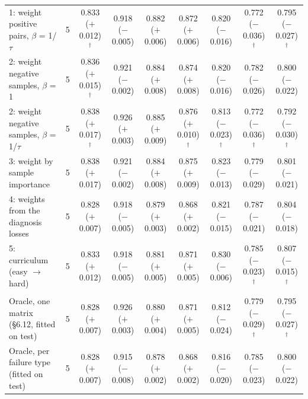 \begin{table}[t]
{\begin{tabular}{l c c c c c c c c}
1: weight positive pairs, $\beta$ = 1/$\tau$ & 5 & 0.833 ($+$0.012)$^{\dagger}$ & 0.918 ($-$0.005) & 0.882 ($+$0.006) & 0.872 ($+$0.006) & 0.820 ($-$0.016) & 0.772 ($-$0.036)$^{\dagger}$ & 0.795 ($-$0.027)$^{\dagger}$ \\
2: weight negative samples, $\beta$ = 1 & 5 & 0.836 ($+$0.015)$^{\dagger}$ & 0.921 ($-$0.002) & 0.884 ($+$0.008) & 0.874 ($+$0.008) & 0.820 ($-$0.016) & 0.782 ($-$0.026) & 0.800 ($-$0.022) \\
2: weight negative samples, $\beta$ = 1/$\tau$ & 5 & 0.838 ($+$0.017)$^{\dagger}$ & 0.926 ($+$0.003) & 0.885 ($+$0.009) & 0.876 ($+$0.010)$^{\dagger}$ & 0.813 ($-$0.023)$^{\dagger}$ & 0.772 ($-$0.036)$^{\dagger}$ & 0.792 ($-$0.030)$^{\dagger}$ \\
3: weight by sample importance & 5 & 0.838 ($+$0.017) & 0.921 ($-$0.002) & 0.884 ($+$0.008) & 0.875 ($+$0.009) & 0.823 ($-$0.013) & 0.779 ($-$0.029) & 0.801 ($-$0.021) \\
4: weights from the diagnosis losses & 5 & 0.828 ($+$0.007) & 0.918 ($-$0.005) & 0.879 ($+$0.003) & 0.868 ($+$0.002) & 0.821 ($-$0.015) & 0.787 ($-$0.021) & 0.804 ($-$0.018) \\
5: curriculum (easy $\rightarrow$ hard) & 5 & 0.833 ($+$0.012) & 0.918 ($-$0.005) & 0.881 ($+$0.005) & 0.871 ($+$0.005) & 0.830 ($-$0.006) & 0.785 ($-$0.023)$^{\dagger}$ & 0.807 ($-$0.015)$^{\dagger}$ \\
\addlinespace
\multicolumn{9}{l}{\emph{Upper bound}} \\
Oracle, one matrix (\S6.12, fitted on test) & 5 & 0.828 ($+$0.007) & 0.926 ($+$0.003) & 0.880 ($+$0.004) & 0.871 ($+$0.005) & 0.812 ($-$0.024) & 0.779 ($-$0.029)$^{\dagger}$ & 0.795 ($-$0.027)$^{\dagger}$ \\
Oracle, per failure type (fitted on test) & 5 & 0.828 ($+$0.007) & 0.915 ($-$0.008) & 0.878 ($+$0.002) & 0.868 ($+$0.002) & 0.816 ($-$0.020) & 0.785 ($-$0.023) & 0.800 ($-$0.022) \\
\bottomrule
\end{tabular}}
\end{table}
